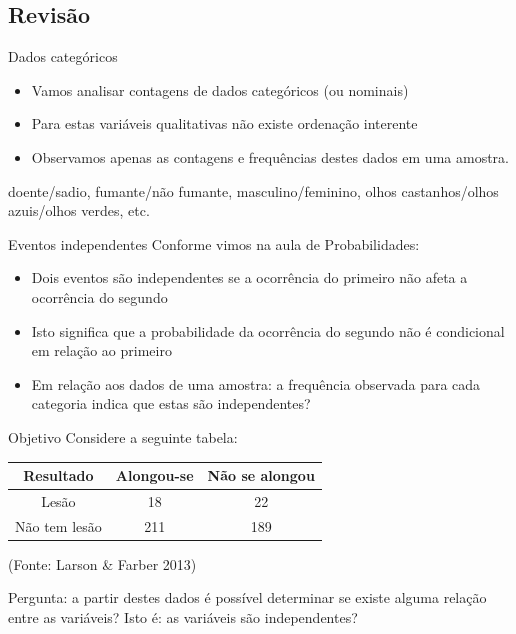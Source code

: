 \documentclass{beamer}
\begin{document}
\subsection{Revisão}

\begin{frame}{Dados categóricos}
  \begin{itemize}
  \item Vamos analisar contagens de dados categóricos (ou nominais)
  \item Para estas variáveis qualitativas não existe ordenação interente
  \item Observamos apenas as contagens e frequências destes dados em
    uma amostra.
  \end{itemize}
  \begin{example}
    doente/sadio, fumante/não fumante, masculino/feminino, olhos
    castanhos/olhos azuis/olhos verdes, etc.
  \end{example}
\end{frame}

\begin{frame}{Eventos independentes}
  Conforme vimos na aula de Probabilidades:
  \begin{itemize}
  \item Dois eventos são independentes se a ocorrência do primeiro não
    afeta a ocorrência do segundo
  \item Isto significa que a probabilidade da ocorrência do segundo
    não é condicional em relação ao primeiro
  \item Em relação aos dados de uma amostra: a frequência observada
    para cada categoria indica que estas são independentes?
  \end{itemize}
\end{frame}

\begin{frame}{Objetivo}
Considere a seguinte tabela:
  \begin{example}
    \begin{tabular}{c|c|c}
      Resultado & Alongou-se & Não se alongou\\
      \hline
      Lesão & 18 & 22\\
      \hline
      Não tem lesão & 211 & 189\\
    \end{tabular}

    (Fonte: Larson \& Farber 2013)
  \end{example}

    Pergunta: a partir destes dados é possível determinar se existe
    alguma relação entre as variáveis? Isto é: as variáveis são independentes?
\end{frame}
\end{document}
